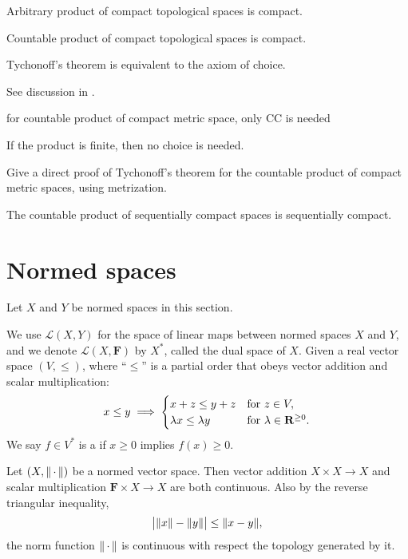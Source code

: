 \begin{namedthm}
    Arbitrary product of compact topological spaces is compact.
\end{namedthm}

\begin{thm}
    Countable product of compact topological spaces is compact.
\end{thm}

Tychonoff's theorem is equivalent to the axiom of choice.

See discussion in  \cite[Section~4.8]{Herrlich_2006}.

for countable product of compact metric space, only CC is needed

If the product is finite, then no choice is needed.

\begin{xca}
    Give a direct proof of Tychonoff's theorem for the countable product of compact metric spaces, using metrization.
\end{xca}

\begin{thm}
    The countable product of sequentially compact spaces is sequentially compact.
\end{thm}

\section{Normed spaces}
Let $X$ and $Y$ be normed spaces in this section.


We use $\mathcal{L}(X,Y)$ for the space of linear maps between normed spaces $X$ and $Y$, and we denote $\mathcal L(X,\mathbf F)$ by $X^*$, called the dual space of $X$. Given a real vector space $(V,\leq)$, where ``$\leq$'' is a partial order that obeys vector addition and scalar multiplication: \[
    x \leq y \implies \begin{cases}
        x + z \leq y + z & \text{for }z \in V,\\ 
        \lambda x \leq \lambda y & \text{for }\lambda \in \mathbf{R}^{\geq 0}.
    \end{cases}
\] We say $f \in V^*$ is a  if $x \geq 0$ implies $f(x) \geq 0$.

\begin{fact}
    Let $(X,\lVert \,\cdot\, \rVert)$ be a normed vector space. Then vector addition $X \times X \to X$ and scalar multiplication $\mathbf F \times X \to X$ are both continuous. Also by the reverse triangular inequality, \[
        \bigl\vert \lVert x \rVert - \lVert y \rVert\bigr\vert \leq \lVert x - y \rVert,
    \] the norm function $\lVert \,\cdot\, \rVert$ is continuous with respect the topology generated by it.
\end{fact}

